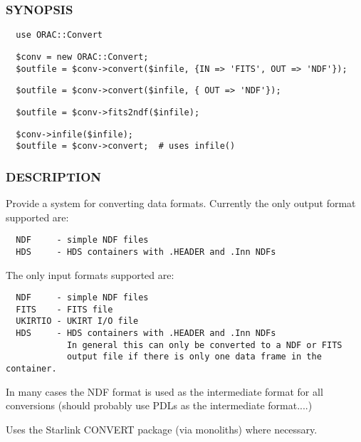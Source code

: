 \subsubsection*{SYNOPSIS\label{ORAC::Convert_SYNOPSIS}}\begin{verbatim}
  use ORAC::Convert
\end{verbatim}
\begin{verbatim}
  $conv = new ORAC::Convert;
  $outfile = $conv->convert($infile, {IN => 'FITS', OUT => 'NDF'});
\end{verbatim}
\begin{verbatim}
  $outfile = $conv->convert($infile, { OUT => 'NDF'});
\end{verbatim}
\begin{verbatim}
  $outfile = $conv->fits2ndf($infile);
\end{verbatim}
\begin{verbatim}
  $conv->infile($infile);
  $outfile = $conv->convert;  # uses infile()
\end{verbatim}
\subsubsection*{DESCRIPTION\label{ORAC::Convert_DESCRIPTION}}

Provide a system for converting data formats. Currently the
only output format supported are:

\begin{verbatim}
  NDF     - simple NDF files
  HDS     - HDS containers with .HEADER and .Inn NDFs
\end{verbatim}


The only input formats supported are:

\begin{verbatim}
  NDF     - simple NDF files
  FITS    - FITS file
  UKIRTIO - UKIRT I/O file
  HDS     - HDS containers with .HEADER and .Inn NDFs
            In general this can only be converted to a NDF or FITS
            output file if there is only one data frame in the container.
\end{verbatim}


In many cases the NDF format is used as the intermediate format for
all conversions (should probably use PDLs as the intermediate
format....)



Uses the Starlink CONVERT package (via monoliths) where necessary.



